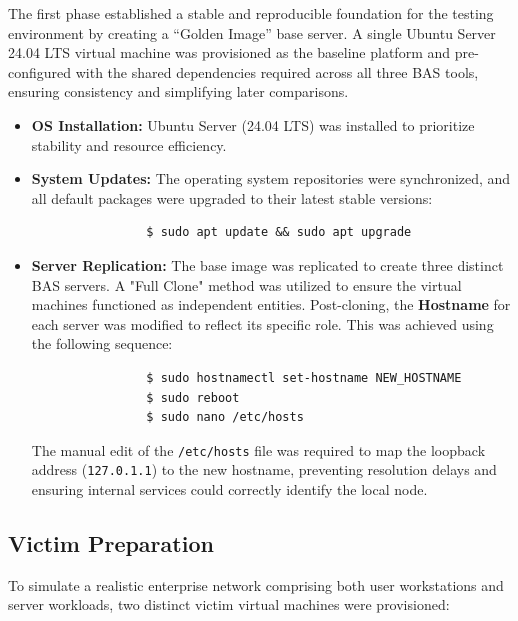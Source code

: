The first phase established a stable and reproducible foundation for the testing environment by creating a “Golden Image” base server. A single Ubuntu Server 24.04 LTS virtual machine was provisioned as the baseline platform and pre-configured with the shared dependencies required across all three BAS tools, ensuring consistency and simplifying later comparisons.
    \begin{itemize}
        \item \textbf{OS Installation:} Ubuntu Server (24.04 LTS) was installed to prioritize stability and resource efficiency.
        \item \textbf{System Updates:} The operating system repositories were synchronized, and all default packages were upgraded to their latest stable versions:
            \begin{lstlisting}
                $ sudo apt update && sudo apt upgrade
            \end{lstlisting}
        \item \textbf{Server Replication:} The base image was replicated to create three distinct BAS servers. A "Full Clone" method was utilized to ensure the virtual machines functioned as independent entities. Post-cloning, the \textbf{Hostname} for each server was modified to reflect its specific role. This was achieved using the following sequence:
            \begin{lstlisting}
                $ sudo hostnamectl set-hostname NEW_HOSTNAME
                $ sudo reboot
                $ sudo nano /etc/hosts
            \end{lstlisting}

    The manual edit of the \texttt{/etc/hosts} file was required to map the loopback address (\texttt{127.0.1.1}) to the new hostname, preventing resolution delays and ensuring internal services could correctly identify the local node.
    \end{itemize}

\subsection{Victim Preparation} 
    To simulate a realistic enterprise network comprising both user workstations and server workloads, two distinct victim virtual machines were provisioned:

